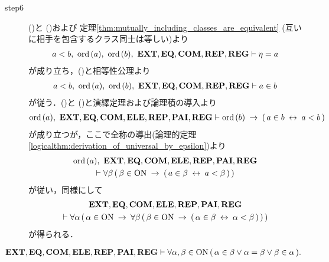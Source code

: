 \begin{prf}
\begin{description}
			\item[step6] ()と
				()および
				定理\ref{thm:mutually_including_classes_are_equivalent} (互いに相手を包含するクラス同士は等しい)より
				\begin{align}
					a < b,\ \ord{a},\ \ord{b},\ \EXTAX,\EQAX,\COMAX,\REPAX,\REGAX \vdash \eta = a
				\end{align}
				が成り立ち，()と相等性公理より
				\begin{align}
					a < b,\ \ord{a},\ \ord{b},\ \EXTAX,\EQAX,\COMAX,\REPAX,\REGAX \vdash a \in b
					\label{fom:element_and_proper_subset_correspond_20}
				\end{align}
				が従う．()と
				()と演繹定理および論理積の導入より
				\begin{align}
					\ord{a},\ \EXTAX,\EQAX,\COMAX,\ELEAX,\REPAX,\PAIAX,\REGAX \vdash 
					\ord{b} \rarrow (\, a \in b \lrarrow a < b\, )
				\end{align}
				が成り立つが，ここで全称の導出(論理的定理\ref{logicalthm:derivation_of_universal_by_epsilon})より
				\begin{align}
					\begin{gathered}
						\ord{a},\ \EXTAX,\EQAX,\COMAX,\ELEAX,\REPAX,\PAIAX,\REGAX \\
						\vdash \forall \beta\, (\, \beta \in \ON \rarrow (\, a \in \beta \lrarrow a < \beta\, )\, )
					\end{gathered}
				\end{align}
				が従い，同様にして
				\begin{align}
					\begin{gathered}
						\mbox{{\bf EXT}},\mbox{{\bf EQ}},\mbox{\bf COM},\mbox{{\bf ELE}},\mbox{{\bf REP}},\mbox{{\bf PAI}},\mbox{{\bf REG}} \\
						\vdash \forall \alpha\, (\, \alpha \in \mathrm{ON} \hspace{0.25em}\rightarrow\hspace{0.25em}
						\forall \beta\, (\, \beta \in \mathrm{ON} \hspace{0.25em}\rightarrow\hspace{0.25em} (\, \alpha \in \beta \hspace{0.25em}\leftrightarrow\hspace{0.25em} \alpha < \beta\, )\, )\, )
					\end{gathered}
				\end{align}
				が得られる．
				\QED
		\end{description}
	\end{prf}
	
	\begin{screen}
		\begin{thm}
		\label{thm:ON_is_totally_ordered}
			\begin{align}
				\mbox{{\bf EXT}},\mbox{{\bf EQ}},\mbox{\bf COM},\mbox{{\bf ELE}},\mbox{{\bf REP}},\mbox{{\bf PAI}},\mbox{{\bf REG}} \vdash 
				\forall \alpha,\beta \in \mathrm{ON}\,
				(\, \alpha \in \beta \vee \alpha = \beta \vee \beta \in \alpha\, ).
			\end{align}
		\end{thm}
	\end{screen}
	
